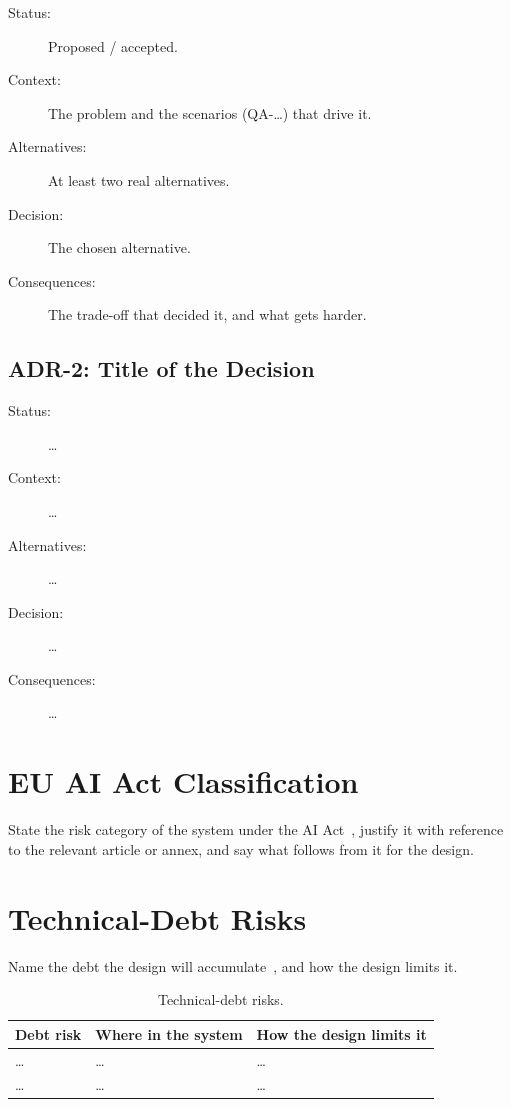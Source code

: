 \documentclass[report]{itvest}
\begin{document}
\begin{description}
  \item[Status:] Proposed / accepted.
  \item[Context:] The problem and the scenarios (QA-\ldots) that drive it.
  \item[Alternatives:] At least two real alternatives.
  \item[Decision:] The chosen alternative.
  \item[Consequences:] The trade-off that decided it, and what gets harder.
\end{description}

\subsection{ADR-2: Title of the Decision}

\begin{description}
  \item[Status:] \ldots
  \item[Context:] \ldots
  \item[Alternatives:] \ldots
  \item[Decision:] \ldots
  \item[Consequences:] \ldots
\end{description}

\section{EU AI Act Classification}

State the risk category of the system under the AI
Act~\cite{eu_ai_act_2024}, justify it with reference to the relevant
article or annex, and say what follows from it for the design.

\section{Technical-Debt Risks}

Name the debt the design will accumulate~\cite{sculley_hidden_2015}, and
how the design limits it.

\begin{table}[h]
  \centering
  \begin{tabularx}{\textwidth}{XXX}
    \toprule
    Debt risk & Where in the system & How the design limits it \\
    \midrule
    \ldots & \ldots & \ldots \\
    \ldots & \ldots & \ldots \\
    \bottomrule
  \end{tabularx}
  \caption{Technical-debt risks.}
  \label{tab:debt}
\end{table}
\end{document}
